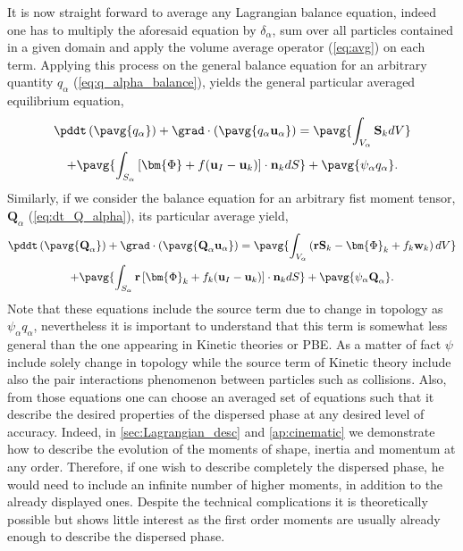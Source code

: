 It is now straight forward to average any Lagrangian balance equation, indeed one has to multiply the aforesaid equation by $\delta_\alpha$, sum over all particles contained in a given domain and apply the volume average operator (\ref{eq:avg}) on each term. 
Applying this process on the general balance equation for an arbitrary quantity $q_\alpha$ (\ref{eq:q_alpha_balance}), yields the general particular averaged equilibrium equation,
\begin{multline}
    \pddt   \left(\pavg{q_\alpha}\right)
    + \grad \cdot \left(\pavg{q_\alpha \textbf{u}_\alpha}\right) 
    = \pavg{\int_{V_\alpha} \textbf{S}_k dV}\\
    + \pavg{\int_{S_\alpha} \left[\bm{\Phi} + f (\textbf{u}_I-\textbf{u}_k) \right] \cdot \textbf{n}_k d S}
    + \pavg{\psi_\alpha q_\alpha}
    .\label{eq:q_avg_p_global}
\end{multline}
Similarly, if we consider the balance equation for an arbitrary fist moment tensor, $\textbf{Q}_\alpha$ (\ref{eq:dt_Q_alpha}), its particular average yield,  
\begin{multline}
    \pddt   \left(\pavg{\textbf{Q}_\alpha}\right)
    + \grad \cdot \left(\pavg{\textbf{Q}_\alpha \textbf{u}_\alpha}\right) 
    = \pavg{\int_{V_\alpha} \left( 
        \textbf{r} \textbf{S}_k 
        - \bm{\Phi}_k
        + f_k  \textbf{w}_k 
    \right) dV}\\
    + \pavg{\int_{S_\alpha} \textbf{r} \left[
        \bm{\Phi}_k
        + f_k (\textbf{u}_I-\textbf{u}_k)
    \right]\cdot \textbf{n}_k  dS}
    + \pavg{\psi_\alpha \textbf{Q}_\alpha}
    .\label{eq:dt_avg_Q_alpha}
\end{multline}
Note that these equations include the source term due to change in topology as $\psi_\alpha q_\alpha$, nevertheless it is important to understand that this term is somewhat less general than the one appearing in Kinetic theories or PBE. 
As a matter of fact $\psi$ include solely change in topology while the source term of Kinetic theory include also the pair interactions phenomenon between particles such as collisions. 
Also, from those equations one can choose an averaged set of equations such that it describe the desired properties of the dispersed phase at any desired level of accuracy.
Indeed, in \ref{sec:Lagrangian_desc} and \ref{ap:cinematic} we demonstrate how to describe the evolution of the moments of shape, inertia and momentum at any order.
Therefore, if one wish to describe completely the dispersed phase, he would need to include an infinite number of higher moments, in addition to the already displayed ones. 
Despite the technical complications it is theoretically possible but shows little interest as the first order moments are usually already enough to describe the dispersed phase.  

